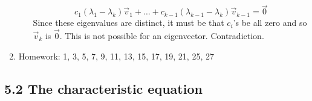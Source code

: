 \documentclass{article}
\begin{document}
\begin{enumerate}
\begin{itemize}
\[
c_1 (\lambda_1-\lambda_k) \vec{v}_1 + \dots + c_{k-1} (\lambda_{k-1}-\lambda_k) \vec{v}_{k-1} = \vec{0}
\] 
Since these eigenvalues are distinct, it must be that $c_i$'s be all zero and so $\vec{v}_k$ is $\vec{0}$. This is not possible for an eigenvector. Contradiction.
\end{itemize}

\item Homework: 1, 3, 5, 7, 9, 11, 13, 15, 17, 19, 21, 25, 27

\end{enumerate}

\subsection{5.2 The characteristic equation}
\end{document}
